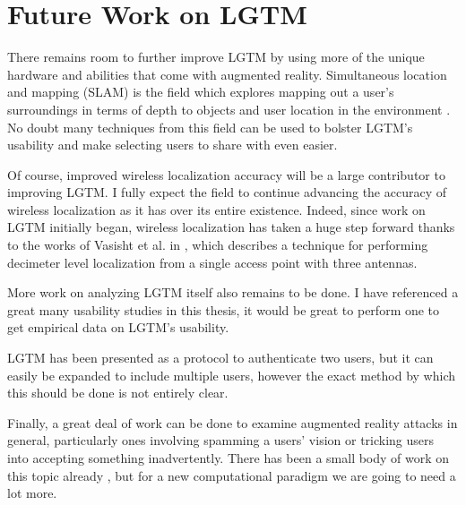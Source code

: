 \documentclass[12pt]{report}
\begin{document}
\section{Future Work on LGTM}
There remains room to further improve LGTM by using more of the unique hardware and abilities that come with augmented reality. Simultaneous location and mapping (SLAM) is the field which explores mapping out a user's surroundings in terms of depth to objects and user location in the environment \cite{ParallelTrackingAndMappingKlein2007,MonoSlamDavison2007,VisualIntertialOdometryNonlinearLeutenegger2014,ProjectTangoWebsite,SlamPart1Durrant-Whyte2006}. No doubt many techniques from this field can be used to bolster LGTM's usability and make selecting users to share with even easier. \par

Of course, improved wireless localization accuracy will be a large contributor to improving LGTM. I fully expect the field to continue advancing the accuracy of wireless localization as it has over its entire existence. Indeed, since work on LGTM initially began, wireless localization has taken a huge step forward thanks to the works of Vasisht et al. in \cite{ChronosSingleAPLocalizationVasisht2016}, which describes a technique for performing decimeter level localization from a single access point with three antennas. \par

More work on analyzing LGTM itself also remains to be done. I have referenced a great many usability studies in this thesis, it would be great to perform one to get empirical data on LGTM's usability. \par

LGTM has been presented as a protocol to authenticate two users, but it can easily be expanded to include multiple users, however the exact method by which this should be done is not entirely clear. \par

Finally, a great deal of work can be done to examine augmented reality attacks in general, particularly ones involving spamming a users' vision or tricking users into accepting something inadvertently. There has been a small body of work on this topic already \cite{SafelyAugmentLebeck2016,SecurityAndPrivacyForARRoesner2014}, but for a new computational paradigm we are going to need a lot more. \par
\end{document}
